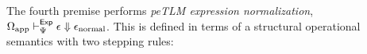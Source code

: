 \documentclass[acmsmall,review,anonymous]{acmart}\settopmatter{printfolios=true,printccs=false,printacmref=false}
\begin{document}
The fourth premise performs \emph{peTLM expression normalization}, $\tsmexpEvalsExp{\Omega_\text{app}}{\Psi}{\epsilon}{\epsilon_\text{normal}}$. This is defined in terms of a structural operational semantics \cite{DBLP:journals/jlp/Plotkin04a} with two stepping rules:
{\small\begin{mathpar}

\end{mathpar}}
\end{document}
